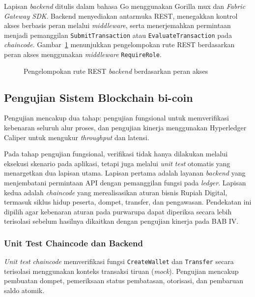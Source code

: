 Lapisan \textit{backend} ditulis dalam bahasa Go menggunakan Gorilla mux dan
\textit{Fabric Gateway SDK}. Backend menyediakan antarmuka REST, menegakkan
kontrol akses berbasis peran melalui \textit{middleware}, serta menerjemahkan
permintaan menjadi pemanggilan \texttt{SubmitTransaction} atau
\texttt{EvaluateTransaction} pada \textit{chaincode}. Gambar~\ref{lst:routes}
menunjukkan pengelompokan rute REST berdasarkan peran akses menggunakan
\textit{middleware} \texttt{RequireRole}.

\begin{figure}[H]

\caption{Pengelompokan rute REST \textit{backend} berdasarkan peran akses}
\label{lst:routes}
\end{figure}

\subsection{Pengujian Sistem Blockchain bi-coin}

Pengujian mencakup dua tahap: pengujian fungsional untuk memverifikasi kebenaran
seluruh alur proses, dan pengujian kinerja menggunakan Hyperledger Caliper untuk
mengukur \textit{throughput} dan latensi.

Pada tahap pengujian fungsional, verifikasi tidak hanya dilakukan melalui
eksekusi skenario pada aplikasi, tetapi juga melalui \textit{unit test} otomatis
yang menargetkan dua lapisan utama. Lapisan pertama adalah layanan
\textit{backend} yang menjembatani permintaan API dengan pemanggilan fungsi pada
\textit{ledger}. Lapisan kedua adalah \textit{chaincode} yang merealisasikan
aturan bisnis Rupiah Digital, termasuk siklus hidup peserta, dompet,
transfer, dan pengawasan. Pendekatan ini dipilih agar kebenaran aturan pada
purwarupa dapat diperiksa secara lebih terisolasi sebelum hasilnya dikaitkan
dengan pengujian kinerja pada BAB IV.

\subsubsection{Unit Test Chaincode dan Backend}

\textit{Unit test} \textit{chaincode} memverifikasi fungsi \texttt{CreateWallet}
dan \texttt{Transfer} secara terisolasi menggunakan konteks transaksi tiruan
(\textit{mock}). Pengujian mencakup pembuatan dompet, pemeriksaan status pembatasan,
otorisasi, dan pembaruan saldo atomik.

